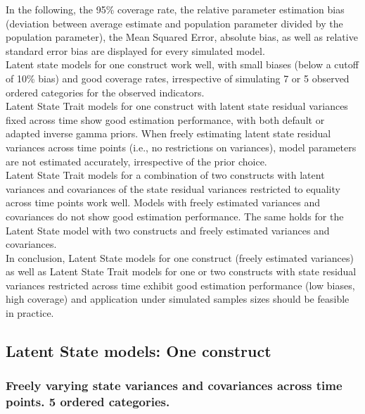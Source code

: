 In the following, the 95\% coverage rate, the relative parameter estimation bias (deviation between average estimate and population parameter divided by the population parameter), the Mean Squared Error, absolute bias, as well as relative standard error bias are displayed for every simulated model. \\
Latent state models for one construct work well, with small biases (below a cutoff of 10\% bias) and good coverage rates, irrespective of simulating 7 or 5 observed ordered categories for the observed indicators.\\
Latent State Trait models for one construct with latent state residual variances fixed across time show good estimation performance, with both default or adapted inverse gamma priors. When freely estimating latent state residual variances across time points (i.e., no restrictions on variances), model parameters are not estimated accurately, irrespective of the prior choice. \\
Latent State Trait models for a combination of two constructs with latent variances and covariances of the state residual variances restricted to equality across time points work well. Models with freely estimated variances and covariances do not show good estimation performance. The same holds for the Latent State model with two constructs and freely estimated variances and covariances. \\
In conclusion, Latent State models for one construct (freely estimated variances) as well as Latent State Trait models for one or two constructs with state residual variances restricted across time exhibit good estimation performance (low biases, high coverage) and application under simulated samples sizes should be feasible in practice.

\subsection{Latent State models: One construct}
   
   \subsubsection{Freely varying state variances and covariances across time points. 5 ordered categories.}
    
